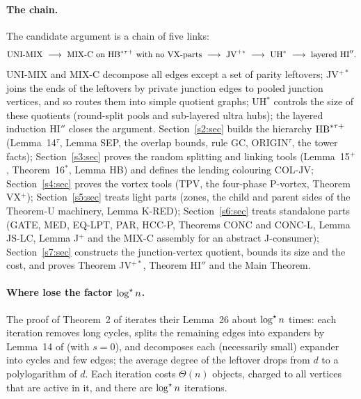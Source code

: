 \paragraph{The chain.} The candidate argument is a chain of five links:
\[
\text{UNI-MIX}\ \longrightarrow\ \text{MIX-C on }\mathrm{HB}^{*\tau{+}}\text{ with no VX-parts}
\ \longrightarrow\ \text{JV}^{+*}\ \longrightarrow\ \text{UH}^{*}
\ \longrightarrow\ \text{layered HI}''.
\]
UNI-MIX and MIX-C decompose all edges except a set of parity leftovers; JV$^{+*}$
joins the ends of the leftovers by private junction edges to pooled junction
vertices, and so routes them into simple quotient graphs; UH$^{*}$ controls the size of these quotients (round-split pools and
sub-layered ultra hubs); the layered induction HI$''$ closes the argument.
Section~\ref{s2:sec} builds the hierarchy $\mathrm{HB}^{*\tau{+}}$ (Lemma~14$^\tau$, Lemma SEP,
the overlap bounds, rule GC, ORIGIN$^\tau$, the tower facts);
Section~\ref{s3:sec} proves the random splitting and linking tools
(Lemma~15$^+$, Theorem~16$^*$, Lemma HB) and defines the lending colouring
COL-JV; Section~\ref{s4:sec} proves the vortex tools (TPV, the four-phase
P-vortex, Theorem VX$^+$); Section~\ref{s5:sec} treats light parts (zones, the
child and parent sides of the Theorem-U machinery, Lemma K-RED);
Section~\ref{s6:sec} treats standalone parts (GATE, MED, EQ-LPT, PAR, HCC-P,
Theorems CONC and CONC-L, Lemma JS-LC, Lemma J$^+$ and the MIX-C assembly for an
abstract J-consumer); Section~\ref{s7:sec} constructs the junction-vertex
quotient, bounds its size and the cost, and proves Theorem JV$^{+*}$,
Theorem HI$''$ and the Main Theorem.

\paragraph{Where \BMnames{} lose the factor $\log^{\star} n$.} The proof of Theorem~2
of \cite{BM} iterates their Lemma~26 about $\log^{\star} n$ times: each iteration
removes long cycles, splits the remaining edges into expanders by Lemma~14 of
\cite{BM} (with $s=0$), and decomposes each (necessarily small) expander into
cycles and few edges; the average degree of the leftover drops from $d$ to a
polylogarithm of $d$. Each iteration costs $\Theta(n)$ objects, charged to all
vertices that are active in it, and there are $\log^{\star} n$ iterations.

